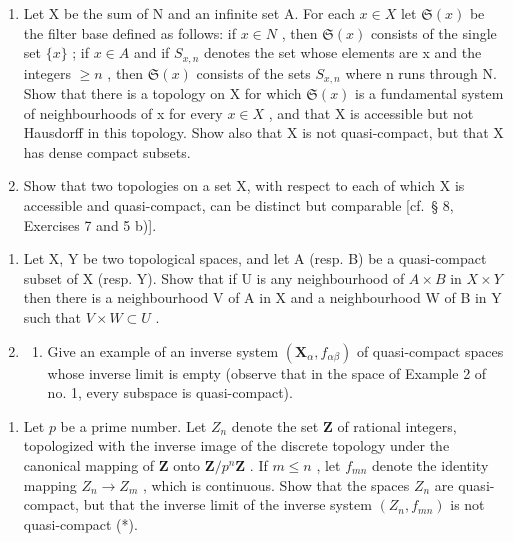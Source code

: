 \begin{enumerate}
\def\labelenumi{\alph{enumi})}
\setcounter{enumi}{1}
\item
  Let X be the sum of N and an infinite set A. For each \(x \in X\) let \(\mathfrak{S}(x)\) be the filter base defined as follows: if \(x \in N\) , then \(\mathfrak{S}(x)\) consists of the single set \(\{x\}\) ; if \(x \in A\) and if \(S_{x,n}\) denotes the set whose elements are x and the integers \(\geqslant n\) , then \(\mathfrak{S}(x)\) consists of the sets \(S_{x,n}\) where n runs through N. Show that there is a topology on X for which \(\mathfrak{S}(x)\) is a fundamental system of neighbourhoods of x for every \(x \in X\) , and that X is accessible but not Hausdorff in this topology. Show also that X is not quasi-compact, but that X has dense compact subsets.
\item
  Show that two topologies on a set X, with respect to each of which X is accessible and quasi-compact, can be distinct but comparable {[}cf.~§ 8, Exercises 7 and 5 b){]}.
\end{enumerate}

\begin{enumerate}
\def\labelenumi{\arabic{enumi})}
\setcounter{enumi}{5}
\item
  Let X, Y be two topological spaces, and let A (resp. B) be a quasi-compact subset of X (resp. Y). Show that if U is any neighbourhood of \(A \times B\) in \(X \times Y\) then there is a neighbourhood V of A in X and a neighbourhood W of B in Y such that \(V \times W \subset U\) .
\item
  \begin{enumerate}
  \def\labelenumii{\alph{enumii})}
  \tightlist
  \item
    Give an example of an inverse system \((\mathbf{X}_{\alpha}, f_{\alpha\beta})\) of quasi-compact spaces whose inverse limit is empty (observe that in the space of Example 2 of no. 1, every subspace is quasi-compact).
  \end{enumerate}
\end{enumerate}

\begin{enumerate}
\def\labelenumi{\alph{enumi})}
\setcounter{enumi}{1}
\tightlist
\item
  Let \(p\) be a prime number. Let \(Z_{n}\) denote the set \(\mathbf{Z}\) of rational integers, topologized with the inverse image of the discrete topology under the canonical mapping of \(\mathbf{Z}\) onto \(\mathbf{Z} / p^{n}\mathbf{Z}\) . If \(m \leqslant n\) , let \(f_{mn}\) denote the identity mapping \(Z_{n} \to Z_{m}\) , which is continuous. Show that the spaces \(Z_{n}\) are quasi-compact, but that the inverse limit of the inverse system \((Z_{n}, f_{mn})\) is not quasi-compact (*).
\end{enumerate}

